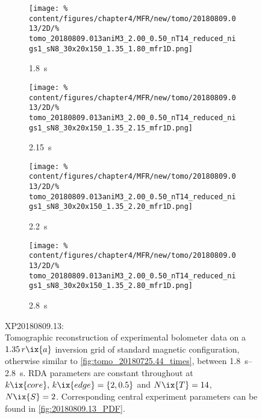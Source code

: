             \begin{figure}[t]%
                \centering%
                \begin{subfigure}{0.48\textwidth}%
                    \centering%
                    \caption{\SI{1.8}{\second}}%
                    \texttt{[image: \%
                        content/figures/chapter4/MFR/new/tomo/20180809.013/2D/\%
                        tomo\_20180809.013aniM3\_2.00\_0.50\_nT14\_reduced\_nigs1\_sN8\_30x20x150\_1.35\_1.80\_mfr1D.png]}%
                \end{subfigure}%
                \hfill%
                \begin{subfigure}{0.48\textwidth}%
                    \centering%
                    \caption{\SI{2.15}{\second}}%
                    \texttt{[image: \%
                        content/figures/chapter4/MFR/new/tomo/20180809.013/2D/\%
                        tomo\_20180809.013aniM3\_2.00\_0.50\_nT14\_reduced\_nigs1\_sN8\_30x20x150\_1.35\_2.15\_mfr1D.png]}%
                \end{subfigure}%
                \newline%
                \begin{subfigure}{0.48\textwidth}%
                    \centering%
                    \caption{\SI{2.2}{\second}}%
                    \texttt{[image: \%
                        content/figures/chapter4/MFR/new/tomo/20180809.013/2D/\%
                        tomo\_20180809.013aniM3\_2.00\_0.50\_nT14\_reduced\_nigs1\_sN8\_30x20x150\_1.35\_2.20\_mfr1D.png]}%
                \end{subfigure}%
                \hfill%
                \begin{subfigure}{0.48\textwidth}%
                    \centering%
                    \caption{\SI{2.8}{\second}}%
                    \texttt{[image: \%
                        content/figures/chapter4/MFR/new/tomo/20180809.013/2D/\%
                        tomo\_20180809.013aniM3\_2.00\_0.50\_nT14\_reduced\_nigs1\_sN8\_30x20x150\_1.35\_2.80\_mfr1D.png]}%
                \end{subfigure}%
                \caption{%
                    XP20180809.13:\\%
                    Tomographic reconstruction of experimental bolometer data on a $1.35\,r\ix{a}$ inversion grid of standard magnetic configuration, otherwise similar to \cref{fig:tomo_20180725.44_times}, between \SIrange{1.8}{2.8}{\second}. RDA parameters are constant throughout at $k\ix{core},\,k\ix{edge}=\left\{2, 0.5\right\}$ and $N\ix{T}=14$, $N\ix{S}=2$. Corresponding central experiment parameters can be found in \cref{fig:20180809.13_PDF}.}\label{fig:tomo_20180809.13_times}%
            \end{figure}%
